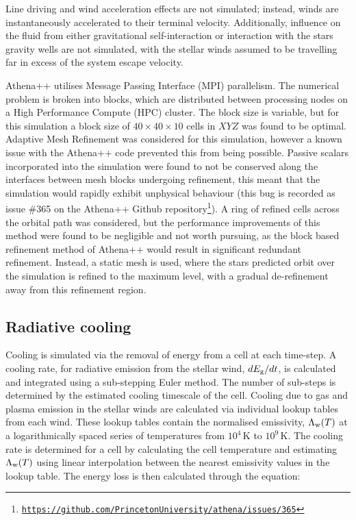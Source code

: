 Line driving and wind acceleration effects are not simulated;
instead, winds are instantaneously accelerated to their terminal velocity.
Additionally, influence on the fluid from either gravitational self-interaction or interaction with the stars gravity wells are not simulated, with the stellar winds assumed to be travelling far in excess of the system escape velocity.

Athena++ utilises Message Passing Interface (MPI) parallelism.
The numerical problem is broken into blocks, which are distributed between processing nodes on a High Performance Compute (HPC) cluster.
The block size is variable, but for this simulation a block size of $40\times 40 \times 10$ cells in $XYZ$ was found to be optimal.
Adaptive Mesh Refinement was considered for this simulation, however a known issue with the Athena++ code prevented this from being possible.
Passive scalars incorporated into the simulation were found to not be conserved along the interfaces between mesh blocks undergoing refinement, this meant that the simulation would rapidly exhibit unphysical behaviour (this bug is recorded as issue \#365 on the Athena++ Github repository\footnote{\texttt{\href{https://github.com/PrincetonUniversity/athena/issues/365.}{https://github.com/PrincetonUniversity/athena/issues/365}}}).
A ring of refined cells across the orbital path was considered, but the performance improvements of this method were found to be negligible and not worth pursuing, as the block based refinement method of Athena++ would result in significant redundant refinement.
Instead, a static mesh is used, where the stars predicted orbit over the simulation is refined to the maximum level, with a gradual de-refinement away from this refinement region.


\subsection{Radiative cooling}

Cooling is simulated via the removal of energy from a cell at each time-step.
A cooling rate, for radiative emission from the stellar wind, $dE_\text{g}/dt$, is calculated and integrated using a sub-stepping Euler method.
The number of sub-steps is determined by the estimated cooling timescale of the cell.
Cooling due to gas and plasma emission in the stellar winds are calculated via individual lookup tables from each wind.
These lookup tables contain the normalised emissivity, $\Lambda_\text{w}(T)$ at a logarithmically spaced series of temperatures from $10^4 \, \si{\kelvin}$ to $10^9 \, \si{\kelvin}$.
The cooling rate is determined for a cell by calculating the cell temperature and estimating $\Lambda_\text{w}(T)$ using linear interpolation between the nearest emissivity values in the lookup table.
The energy loss is then calculated through the equation:

